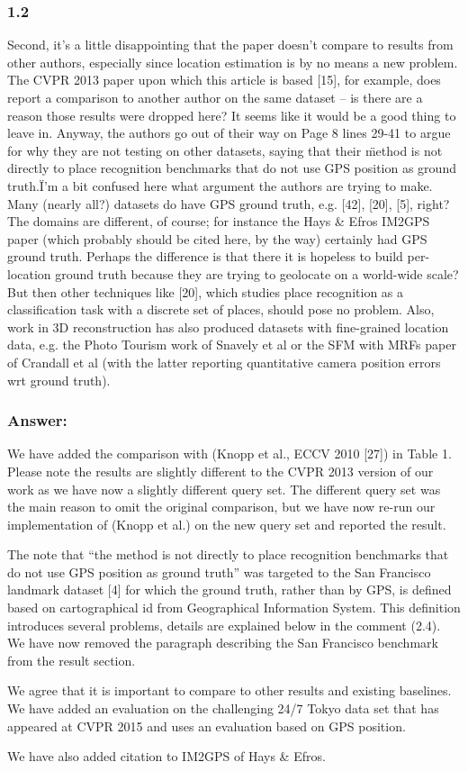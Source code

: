 \documentclass[a4paper,12pt]{article}
\begin{document}
\subsubsection*{1.2}
Second, it's a little disappointing that the paper doesn't compare to results from other authors, especially since location estimation is by no means a new problem. The CVPR 2013 paper upon which this article is based [15], for example, does report a comparison to another author on the same dataset -- is there are a reason those results were dropped here? It seems like it would be a good thing to leave in.
     Anyway, the authors go out of their way on Page 8 lines 29-41 to argue for why they are not testing on other datasets, saying that their \"method is not directly to place recognition benchmarks that do not use GPS position as ground truth.\" I'm a bit confused here what argument the authors are trying to make.
Many (nearly all?) datasets do have GPS ground truth, e.g. [42], [20], [5], right? The domains are different, of course; for instance the Hays \& Efros IM2GPS paper (which probably should be cited here, by the way) certainly had GPS ground truth. Perhaps the difference is that there it is hopeless to build per-location ground truth because they are trying to geolocate on a world-wide scale? But then other techniques like [20], which studies place recognition as a classification task with a discrete set of places, should pose no problem. Also, work in 3D reconstruction has also produced datasets with fine-grained location data, e.g. the Photo Tourism work of Snavely et al or the SFM with MRFs paper of Crandall et al (with the latter reporting quantitative camera position errors wrt ground truth).
{\color{blue}
\subsubsection*{Answer:}
We have added the comparison with (Knopp et al., ECCV 2010 [27]) in Table 1. Please note the results are slightly different to the CVPR 2013 version of our work as we have now a slightly different query set. The different query set was the main reason to omit the original comparison, but we have now re-run our implementation of (Knopp et al.) on the new query set and reported the result.

The note that “the method is not directly to place recognition benchmarks that do not use GPS position as ground truth” was targeted to the San Francisco landmark dataset [4] for which the ground truth, rather than by GPS, is defined based on cartographical id from Geographical Information System. This definition introduces several problems, details are explained below in the comment (2.4). We have now removed the paragraph describing the San Francisco benchmark from the result section.

We agree that it is important to compare to other results and existing baselines. We have added an evaluation on the challenging 24/7 Tokyo data set that has appeared at CVPR 2015 and uses an evaluation based on GPS position. 

We have also added citation to IM2GPS of Hays \& Efros. 
}
\end{document}
